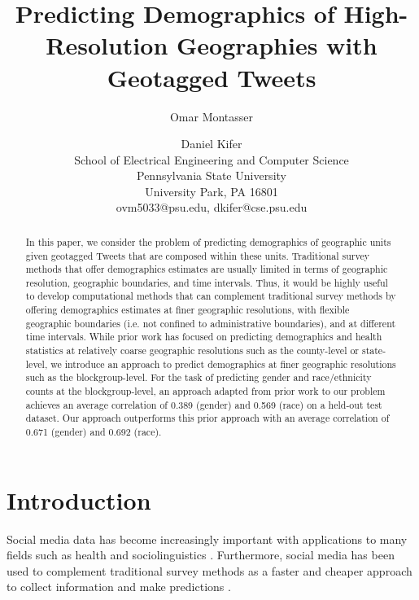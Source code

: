 \documentclass[letterpaper]{article}
\begin{document}
%

\title{Predicting Demographics of High-Resolution Geographies with Geotagged Tweets}
\author{Omar Montasser \and Daniel Kifer\\
School of Electrical Engineering and Computer Science\\
Pennsylvania State University \\
University Park, PA 16801\\
ovm5033@psu.edu, dkifer@cse.psu.edu
}
\maketitle
\begin{abstract}

In this paper, we consider the problem of predicting demographics of geographic units given geotagged Tweets that are composed within these units. Traditional survey methods that offer demographics estimates are usually limited in terms of geographic resolution, geographic boundaries, and time intervals. Thus, it would be highly useful to develop computational methods that can complement traditional survey methods by offering demographics estimates at finer geographic resolutions, with flexible geographic boundaries (i.e. not confined to administrative boundaries), and at different time intervals. While prior work has focused on predicting demographics and health statistics at relatively coarse geographic resolutions such as the county-level or state-level, we introduce an approach to predict demographics at finer geographic resolutions such as the blockgroup-level. For the task of predicting gender and race/ethnicity counts at the blockgroup-level, an approach adapted from prior work to our problem achieves an average correlation of 0.389 (gender) and 0.569 (race) on a held-out test dataset. Our approach outperforms this prior approach with an average correlation of 0.671 (gender) and 0.692 (race). 

\end{abstract}

\section{Introduction}

\noindent Social media data has become increasingly important with applications to many fields such as health \cite{culotta2014estimating} and sociolinguistics \cite{eisenstein2014diffusion}. Furthermore, social media has been used to complement traditional survey methods as a faster and cheaper approach to collect information and make predictions \cite{benton2016collective}.
\end{document}
